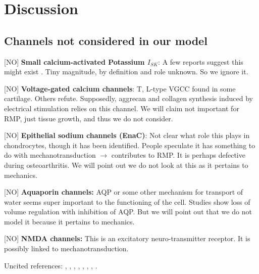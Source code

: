 \section*{Discussion}
\label{sec:discussion}



\subsection*{Channels not considered in our model}
\label{sec:channels-ignored}

[NO] {\bf Small calcium-activated Potassium $I_{SK}$}: A few reports
suggest this might exist \citep{Halletal1996,
  BarrettJolleyetal2010}. Tiny magnitude, by definition and role
unknown. So we ignore it.

[NO] {\bf Voltage-gated calcium channels}: T, L-type VGCC found in
some cartilage. Others refute. Supposedly, aggrecan and collagen
synthesis induced by electrical stimulation relies on this channel. We
will claim not important for RMP, just tissue growth, and thus we do
not consider.

[NO] {\bf Epithelial sodium channels (EnaC)}: Not clear what role this
plays in chondrocytes, though it has been identified. People speculate
it has something to do with mechanotransduction $\rightarrow$
contributes to RMP. It is perhaps defective during osteoarthritis. We
will point out we do not look at this as it pertains to mechanics.

[NO] {\bf Aquaporin channels:} AQP or some other mechanism for
transport of water seems super important to the functioning of the
cell. Studies show loss of volume regulation with inhibition of
AQP. But we will point out that we do not model it because it pertains
to mechanics.

[NO] {\bf NMDA channels:} This is an excitatory neuro-transmitter
receptor. It is possibly linked to mechanotransduction.


Uncited references:
\cite{ArcherWest2003},
\cite{Grishkoetal2010},
\cite{Hille2001},
\cite{LesageLazdunski2000},
\cite{MillwardSadleretal2000},
\cite{Nygrenetal1998},
\cite{Scholz2002},
\cite{Tsugaetal2001}.

